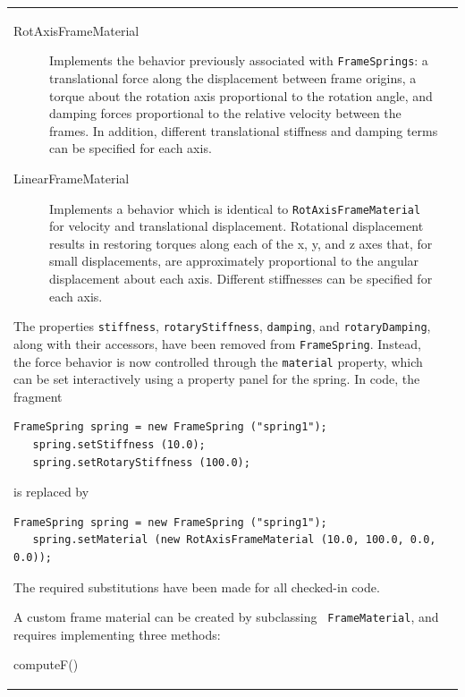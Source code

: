 \documentclass{article}
\begin{document}
\begin{tabular}{ll}
\begin{description}

\item[RotAxisFrameMaterial] \mbox{} 

Implements the behavior previously associated with {\tt FrameSprings}:
a translational force along the displacement between frame origins, a
torque about the rotation axis proportional to the rotation angle, and
damping forces proportional to the relative velocity between the
frames.  In addition, different translational stiffness and damping
terms can be specified for each axis.

\item[LinearFrameMaterial] \mbox{} 

Implements a behavior which is identical to {\tt RotAxisFrameMaterial}
for velocity and translational displacement. Rotational displacement
results in restoring torques along each of the x, y, and z axes that,
for small displacements, are approximately proportional to the angular
displacement about each axis.  Different stiffnesses can be specified
for each axis.

\end{description}

The properties {\tt stiffness}, {\tt rotaryStiffness}, {\tt damping},
and {\tt rotaryDamping}, along with their accessors, have been removed
from {\tt FrameSpring}. Instead, the force behavior is now controlled
through the {\tt material} property, which can be set interactively
using a property panel for the spring. In code, the fragment
\begin{lstlisting}[]
   FrameSpring spring = new FrameSpring ("spring1");
   spring.setStiffness (10.0);
   spring.setRotaryStiffness (100.0);
\end{lstlisting}
is replaced by
\begin{lstlisting}[]
   FrameSpring spring = new FrameSpring ("spring1");
   spring.setMaterial (new RotAxisFrameMaterial (10.0, 100.0, 0.0, 0.0));
\end{lstlisting}

The required substitutions have been made for all checked-in code.

A custom frame material can be created by subclassing {\tt
FrameMaterial}, and requires implementing three methods:

\begin{description}

\item[computeF()] \mbox{}


\end{description}
\end{tabular}
\end{document}
